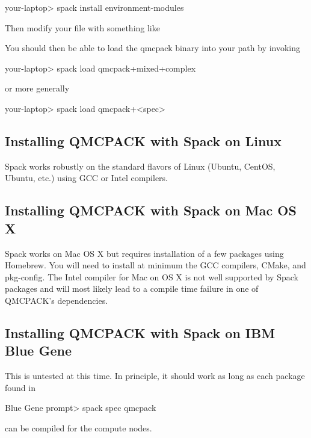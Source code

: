 \begin{shade}
your-laptop> spack install environment-modules
\end{shade}

Then modify your  file with something like


You should then be able to load the qmcpack binary into your path by
invoking

\begin{shade}
your-laptop> spack load qmcpack+mixed+complex%
\end{shade}
or more generally

\begin{shade}
your-laptop> spack load qmcpack+<spec>
\end{shade}

\subsection{Installing QMCPACK with Spack on Linux}
Spack works robustly on the standard flavors of Linux (Ubuntu, CentOS,
Ubuntu, etc.) using GCC or Intel compilers.

\subsection{Installing QMCPACK with Spack on Mac OS X}
Spack works on Mac OS X but requires installation of a few packages
using Homebrew. You will need to install at minimum the GCC compilers,
CMake, and pkg-config. The Intel compiler for Mac on OS X is not well
supported by Spack packages and will most likely lead to a compile
time failure in one of QMCPACK's dependencies.

\subsection{Installing QMCPACK with Spack on IBM Blue Gene}
This is untested at this time. In principle, it should work as long as each
package found in

\begin{shade}
Blue Gene prompt> spack spec qmcpack
\end{shade}
can be compiled for the compute nodes.

